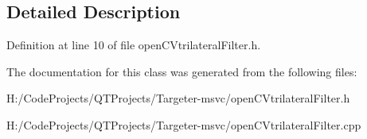 \subsection{Detailed Description}


Definition at line 10 of file open\+C\+Vtrilateral\+Filter.\+h.



The documentation for this class was generated from the following files\+:\begin{DoxyCompactItemize}
\item 
H\+:/\+Code\+Projects/\+Q\+T\+Projects/\+Targeter-\/msvc/open\+C\+Vtrilateral\+Filter.\+h\item 
H\+:/\+Code\+Projects/\+Q\+T\+Projects/\+Targeter-\/msvc/open\+C\+Vtrilateral\+Filter.\+cpp\end{DoxyCompactItemize}
